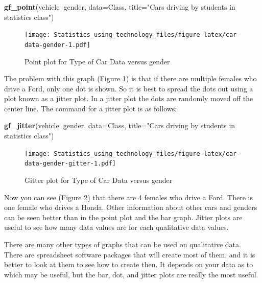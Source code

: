\documentclass[]{book}
\newenvironment{Shaded}{\begin{snugshade}}{\end{snugshade}}
\newcommand{\DataTypeTok}[1]{\textcolor[rgb]{0.13,0.29,0.53}{#1}}
\newcommand{\KeywordTok}[1]{\textcolor[rgb]{0.13,0.29,0.53}{\textbf{#1}}}
\newcommand{\NormalTok}[1]{#1}
\newcommand{\OperatorTok}[1]{\textcolor[rgb]{0.81,0.36,0.00}{\textbf{#1}}}
\newcommand{\StringTok}[1]{\textcolor[rgb]{0.31,0.60,0.02}{#1}}
\begin{document}
\begin{Shaded}
\begin{Highlighting}[]
\KeywordTok{gf_point}\NormalTok{(vehicle}\OperatorTok{~}\NormalTok{gender, }\DataTypeTok{data=}\NormalTok{Class, }\DataTypeTok{title=}\StringTok{"Cars driving by students in statistics class"}\NormalTok{)}
\end{Highlighting}
\end{Shaded}

\begin{figure}
\centering
\texttt{[image: Statistics\_using\_technology\_files/figure-latex/car-data-gender-1.pdf]}
\caption{\label{fig:car-data-gender}Point plot for Type of Car Data versus gender}
\end{figure}

The problem with this graph (Figure \ref{fig:car-data-gender}) is that if there are multiple females who drive a Ford, only one dot is shown. So it is best to spread the dots out using a plot known as a jitter plot. In a jitter plot the dots are randomly moved off the center line. The command for a jitter plot is as follows:



\begin{Shaded}
\begin{Highlighting}[]
\KeywordTok{gf_jitter}\NormalTok{(vehicle}\OperatorTok{~}\NormalTok{gender, }\DataTypeTok{data=}\NormalTok{Class, }\DataTypeTok{title=}\StringTok{"Cars driving by students in statistics class"}\NormalTok{)}
\end{Highlighting}
\end{Shaded}

\begin{figure}
\centering
\texttt{[image: Statistics\_using\_technology\_files/figure-latex/car-data-gender-gitter-1.pdf]}
\caption{\label{fig:car-data-gender-gitter}Gitter plot for Type of Car Data versus gender}
\end{figure}

Now you can see (Figure \ref{fig:car-data-gender-gitter}) that there are 4 females who drive a Ford. There is one female who drives a Honda. Other information about other cars and genders can be seen better than in the point plot and the bar graph. Jitter plots are useful to see how many data values are for each qualitative data values.

There are many other types of graphs that can be used on qualitative data. There are spreadsheet software packages that will create most of them, and it is better to look at them to see how to create then. It depends on your data as to which may be useful, but the bar, dot, and jitter plots are really the most useful.
\end{document}
